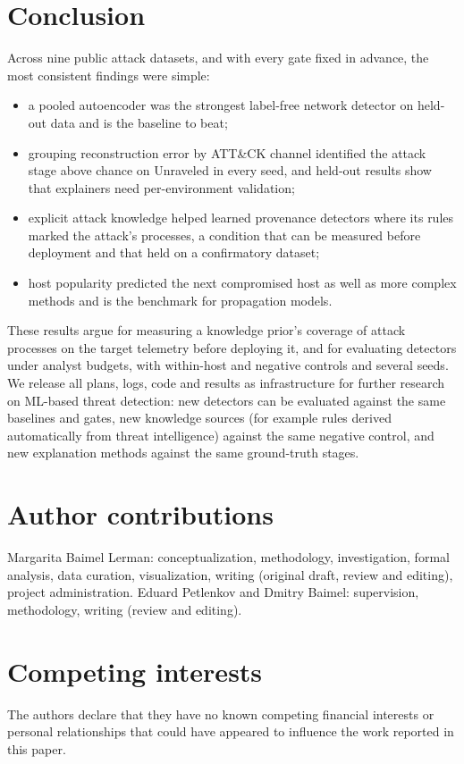 \documentclass[acmlarge,screen,review]{acmart}
\begin{document}
\section{Conclusion}\label{sec:conclusion}
Across nine public attack datasets, and with every gate fixed in advance, the most consistent findings were simple:
\begin{itemize}
\item a pooled autoencoder was the strongest label-free network detector on held-out data and is the baseline to beat;
\item grouping reconstruction error by ATT\&CK channel identified the attack stage above chance on Unraveled in every
seed, and held-out results show that explainers need per-environment validation;
\item explicit attack knowledge helped learned provenance detectors where its rules marked the attack's processes, a
condition that can be measured before deployment and that held on a confirmatory dataset;
\item host popularity predicted the next compromised host as well as more complex methods and is the benchmark for
propagation models.
\end{itemize}
These results argue for measuring a knowledge prior's coverage of attack processes on the target telemetry before
deploying it, and for evaluating detectors under analyst budgets, with within-host and negative controls and several
seeds. We release all plans, logs, code and results as infrastructure for further research on ML-based threat
detection: new detectors can be evaluated against the same baselines and gates, new knowledge sources (for example
rules derived automatically from threat intelligence) against the same negative control, and new explanation methods
against the same ground-truth stages.

\section*{Author contributions}
Margarita Baimel Lerman: conceptualization, methodology, investigation, formal analysis, data curation,
visualization, writing (original draft, review and editing), project administration. Eduard Petlenkov and Dmitry
Baimel: supervision, methodology, writing (review and editing).

\section*{Competing interests}
The authors declare that they have no known competing financial interests or personal relationships that could have
appeared to influence the work reported in this paper.
\end{document}
